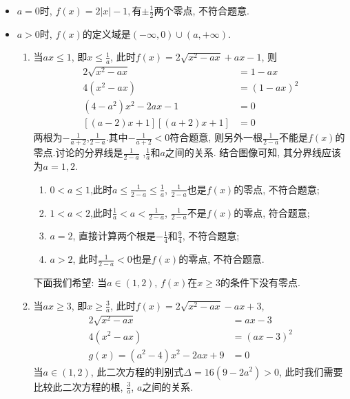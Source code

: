\begin{jie}
    \begin{itemize}
        \item \(a=0\)时, \(f(x)=2|x|-1,\)有\(\pm\frac{1}{2}\)两个零点, 不符合题意.
        \item \(a>0\)时, \(f(x)\)的定义域是\((-\infty,0)\cup(a,+\infty)\).
        \begin{enumerate}
            \item 当\(ax\leq 1\), 即\(x\leq \frac{1}{a}\), 此时\(f(x)=2\sqrt{x^2-ax}+ax-1\),
            则\begin{align*}
                2\sqrt{x^2-ax}&=1-ax\\
                4(x^2-ax)&=(1-ax)^2\\
                (4 - a^{2})x^{2} - 2a x - 1 &= 0\\
                 [(a - 2)x + 1][(a + 2)x + 1] &= 0 
            \end{align*}
            两根为\(-\frac{1}{a+2}\),\(\frac{1}{2-a}\).其中\(-\frac{1}{a+2}<0\)符合题意,
            则另外一根\(\frac{1}{2-a}\)不能是\(f(x)\)的零点.讨论的分界线是\(\frac{1}{2-a}\)
            ,\(\frac{1}{a}\)和\(a\)之间的关系.  结合图像可知, 其分界线应该为\(a=1,2\).
            \begin{enumerate}
                \item \(0<a\leq 1\),此时\(a\leq \frac{1}{2-a}\leq\frac{1}{a}\), \(\frac{1}{2-a}\)也是\(f(x)\)的零点, 不符合题意;
                \item \(1<a<2\),此时\(\frac{1}{a}<a<\frac{1}{2-a}\), \(\frac{1}{2-a}\)不是\(f(x)\)的零点, 符合题意;
                \item \(a=2\), 直接计算两个根是\(-\frac{1}{4}\)和\(\frac{9}{4}\), 不符合题意;
                \item \(a>2\), 此时\(\frac{1}{2-a}<0\)也是\(f(x)\)的零点, 不符合题意.
            \end{enumerate}
            下面我们希望: 当\(a\in (1,2)\), \(f(x)\)在\(x\geq 3\)的条件下没有零点.
            \item 当\(ax\geq 3\), 即\(x\geq \frac{3}{a}\), 此时\(f(x)=2\sqrt{x^2-ax}-ax+3\),
            \begin{align*}
                2\sqrt{x^2-ax}&=ax-3\\
                4(x^2-ax)&=(ax-3)^2\\
               g(x)= (a^{2}-4)x^{2} - 2a x +9 &= 0
            \end{align*}
            当\(a\in (1,2)\), 此二次方程的判别式\(\Delta=16(9-2a^2)>0\),
            此时我们需要比较此二次方程的根, \(\frac{3}{a}\), \(a\)之间的关系.

\end{enumerate}
\end{itemize}
\end{jie}
